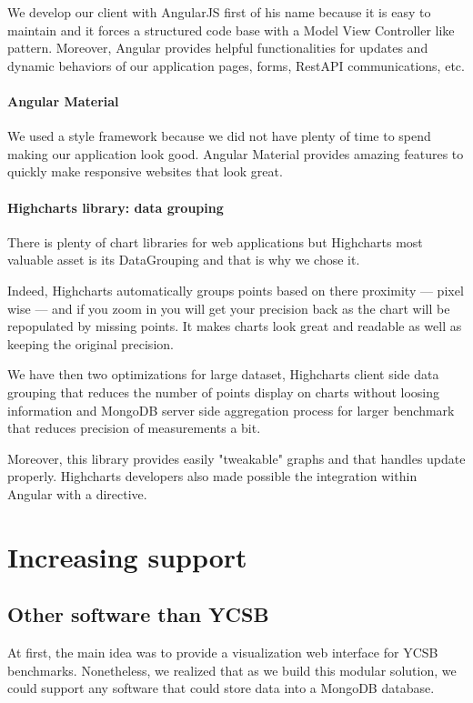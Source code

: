 \documentclass[a4paper,11pt]{report}
\begin{document}
We develop our client with AngularJS first of his name because it is easy to maintain and it forces a structured code base with a Model View Controller like pattern. Moreover, Angular provides helpful functionalities for updates and dynamic behaviors of our application pages, forms, RestAPI communications, etc. \cite{angular:website}

\paragraph{Angular Material} We used a style framework because we did not have plenty of time to spend making our application look good. Angular Material provides amazing features to quickly make responsive websites that look great.

\paragraph{Highcharts library: data grouping}\label{data_grouping} There is plenty of chart libraries for web applications but Highcharts most valuable asset is its DataGrouping and that is why we chose it.

Indeed, Highcharts automatically groups points based on there proximity --- pixel wise --- and if you zoom in you will get your precision back as the chart will be repopulated by missing points. It makes charts look great and readable as well as keeping the original precision.

We have then two optimizations for large dataset, Highcharts client side data grouping that reduces the number of points display on charts without loosing information and MongoDB server side aggregation process for larger benchmark that reduces precision of measurements a bit.

Moreover, this library provides easily "tweakable" graphs and that handles update properly. Highcharts developers also made possible the integration within Angular with a directive.

\section{Increasing support}

\subsection{Other software than YCSB}

At first, the main idea was to provide a visualization web interface for YCSB benchmarks. Nonetheless, we realized that as we build this modular solution, we could support any software that could store data into a MongoDB database.
\end{document}

